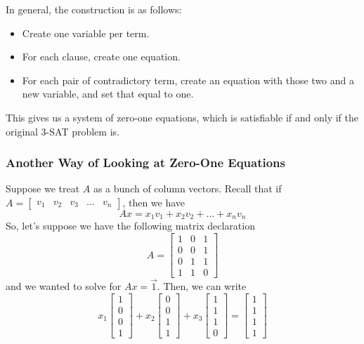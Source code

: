 \documentclass[letterpaper]{article}
\begin{document}
In general, the construction is as follows: 
\begin{itemize}
    \item Create one variable per term. 
    \item For each clause, create one equation. 
    \item For each pair of contradictory term, create an equation with those two and a new variable, and set that equal to one. 
\end{itemize}
This gives us a system of zero-one equations, which is satisfiable if and only if the original 3-SAT problem is. 

\subsubsection{Another Way of Looking at Zero-One Equations}
Suppose we treat $A$ as a bunch of column vectors. Recall that if $A = \begin{bmatrix}
    v_1 & v_2 & v_3 & \dots & v_n
\end{bmatrix}$, then we have 
\[Ax = x_1 v_1 + x_2 v_2 + \dots + x_n v_n\]
So, let's suppose we have the following matrix declaration 
\[A = \begin{bmatrix}
    1 & 0 & 1 \\ 0 & 0 & 1 \\ 0 & 1 & 1 \\ 1 & 1 & 0 
\end{bmatrix}\]
and we wanted to solve for $Ax = \vec{1}$. Then, we can write 
\[
    x_1 \begin{bmatrix}
        1 \\ 0 \\ 0 \\ 1
    \end{bmatrix} + x_2 \begin{bmatrix}
        0 \\ 0 \\ 1 \\ 1
    \end{bmatrix} + x_3 \begin{bmatrix}
        1 \\ 1 \\ 1\\ 0
    \end{bmatrix} = \begin{bmatrix}
        1 \\ 1 \\ 1 \\ 1
    \end{bmatrix}
\]
\end{document}
